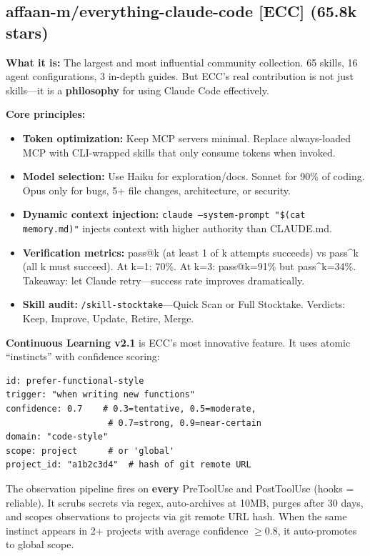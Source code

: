 \documentclass[11pt,a4paper]{article}
\begin{document}
\subsection{affaan-m/everything-claude-code [ECC] (65.8k stars)}

\textbf{What it is:} The largest and most influential community collection. 65 skills, 16 agent configurations, 3 in-depth guides. But ECC's real contribution is not just skills---it is a \textbf{philosophy} for using Claude Code effectively.

\textbf{Core principles:}
\begin{itemize}
  \item \textbf{Token optimization:} Keep MCP servers minimal. Replace always-loaded MCP with CLI-wrapped skills that only consume tokens when invoked.
  \item \textbf{Model selection:} Use Haiku for exploration/docs. Sonnet for 90\% of coding. Opus only for bugs, 5+ file changes, architecture, or security.
  \item \textbf{Dynamic context injection:} \texttt{claude --system-prompt "\$(cat memory.md)"} injects context with higher authority than CLAUDE.md.
  \item \textbf{Verification metrics:} pass@k (at least 1 of k attempts succeeds) vs pass\textasciicircum k (all k must succeed). At k=1: 70\%. At k=3: pass@k=91\% but pass\textasciicircum k=34\%. Takeaway: let Claude retry---success rate improves dramatically.
  \item \textbf{Skill audit:} \texttt{/skill-stocktake}---Quick Scan or Full Stocktake. Verdicts: Keep, Improve, Update, Retire, Merge.
\end{itemize}

\textbf{Continuous Learning v2.1} is ECC's most innovative feature. It uses atomic ``instincts'' with confidence scoring:

\begin{lstlisting}
id: prefer-functional-style
trigger: "when writing new functions"
confidence: 0.7    # 0.3=tentative, 0.5=moderate,
                    # 0.7=strong, 0.9=near-certain
domain: "code-style"
scope: project      # or 'global'
project_id: "a1b2c3d4"  # hash of git remote URL
\end{lstlisting}

The observation pipeline fires on \textbf{every} PreToolUse and PostToolUse (hooks = reliable). It scrubs secrets via regex, auto-archives at 10MB, purges after 30 days, and scopes observations to projects via git remote URL hash. When the same instinct appears in 2+ projects with average confidence $\geq$0.8, it auto-promotes to global scope.
\end{document}
